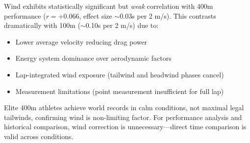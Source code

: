 Wind exhibits statistically significant but \textit{weak} correlation with 400m performance ($r = +0.066$, effect size $\sim$0.03s per 2 m/s). This contrasts dramatically with 100m ($\sim$0.10s per 2 m/s) due to:
\begin{itemize}
    \item Lower average velocity reducing drag power
    \item Energy system dominance over aerodynamic factors
    \item Lap-integrated wind exposure (tailwind and headwind phases cancel)
    \item Measurement limitations (point measurement insufficient for full lap)
\end{itemize}

Elite 400m athletes achieve world records in calm conditions, not maximal legal tailwinds, confirming wind is non-limiting factor. For performance analysis and historical comparison, wind correction is unnecessary—direct time comparison is valid across conditions.
